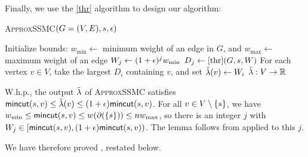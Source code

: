 Finally, we use the \ref{thr} algorithm to design our \ssc algorithm:

\begin{algorithm}
\caption{\textsc{ApproxSSMC}$(G=(V,E),s,\epsilon)$}
\begin{algorithmic}[1]
 \State Initialize bounds: $ w_{\min} \gets$ minimum weight of an edge in $G$, and $ w_{\max}\gets$ maximum weight of an edge %
 \State $ W_j\gets (1+\epsilon)^j w_{\min}$
 \State $D_j\gets \ref{thr}(G,s, W)$
\EndFor
\State For each vertex $v\in V$, take the largest $D_i$ containing $v$, and set $\tilde{\lambda}(v)\gets  W_i$
\State\Return $\tilde{\lambda}:V\to \mathbb R$
\end{algorithmic}
\end{algorithm}

\BL
W.h.p., the output $\tilde{\lambda}$ of \textsc{ApproxSSMC} satisfies $\textsf{\textup{mincut}}(s,v) \le \tilde{\lambda}(v) \le (1+\epsilon)\textsf{\textup{mincut}}(s,v)$.
\EL
\BP
For all $v\in V\setminus\{s\}$, we have $w_{\min}\le\textsf{\textup{mincut}}(s,v)\le w(\partial(\{s\}))\le nw_{\max}$, so there is an integer $j$ with $ W_j\in[\textsf{\textup{mincut}}(s,v),(1+\epsilon)\textsf{\textup{mincut}}(s,v))$. The lemma follows from  applied to this $j$.
\EP

We have therefore proved , restated below.
\SSMC*

